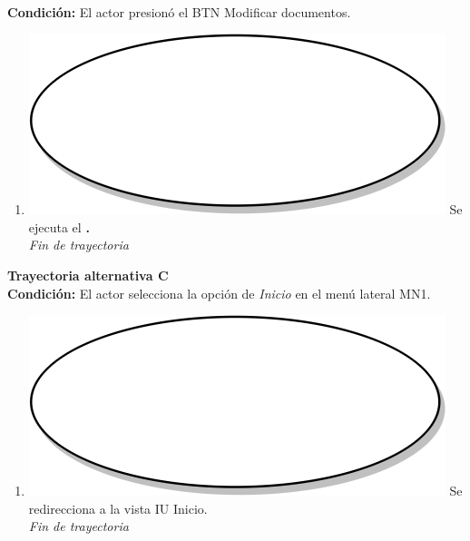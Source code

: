\textbf{} \\
\textbf{Condición:} El actor presionó el BTN Modificar documentos. \\
 \begin{enumerate}[label=B\arabic*]
    \item {\includegraphics[scale=.05]{Capitulo3/img/proceso.png} Se ejecuta el \textbf{.}} \\
    \textit{Fin de trayectoria} \\
\end{enumerate}

\textbf{Trayectoria alternativa C} \label{cu3_ta_c} \\
\textbf{Condición:} El actor selecciona la opción de \textit{Inicio} en el menú lateral MN1. \\
 \begin{enumerate}[label=C\arabic*]
    \item {\includegraphics[scale=.05]{Capitulo3/img/proceso.png} Se redirecciona a la vista IU Inicio.} \\
    \textit{Fin de trayectoria} \\
\end{enumerate}

